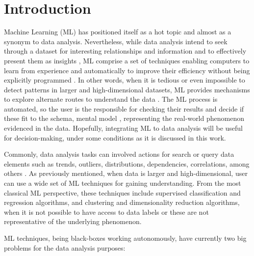 
\chapter{Introduction}  %
\label{chapter1}

\graphicspath{{Chapter1/figs/}}

Machine Learning (ML) has positioned itself as a hot topic and almost as a synonym to data analysis. Nevertheless, while data analysis intend to seek through a dataset for interesting relationships and information and to effectively present them as insights \cite{TukeyJohnW.andWilk1966DataOverview}, ML comprise a set of techniques enabling computers to learn from experience and automatically to improve their efficiency \cite{Michie1968MemoLearning} without being explicitly programmed \cite{Koza1996}. In other words, when it is tedious or even impossible to detect patterns in larger and high-dimensional datasets, ML provides mechanisms to explore alternate routes to understand the data \cite{Yu2003ExploratoryAnalysis}. The ML process is automated, so the user is the responsible for checking their results and decide if these fit to the schema, mental model \cite{Grolemund2014AAnalysis}, representing the real-world phenomenon evidenced in the data. Hopefully, integrating ML to data analysis will be useful for decision-making, under some conditions as it is discussed in this work.

Commonly, data analysis tasks can involved actions for search or query data elements such as trends, outliers, distributions, dependencies, correlations, among others \cite{Munzner2014VisualizationDesign}. As previously mentioned, when data is larger and high-dimensional, user can use a wide set of ML techniques for gaining understanding. From the most classical ML perspective, these techniques include supervised classification and regression algorithms, and clustering and dimensionality reduction algorithms, when it is not possible to have access to data labels or these are not representative of the underlying phenomenon.  

ML techniques, being black-boxes working autonomously, have currently two big problems for the data analysis purposes: 

